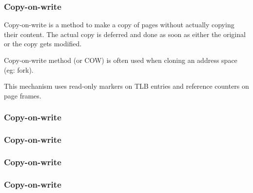 
\begin{frame}
  \frametitle{Copy-on-write}

  Copy-on-write is a method to make a copy of pages without actually copying their content. The actual copy is deferred and done as soon as either the original or the copy gets modified.

  \-

  Copy-on-write method (or COW) is often used when cloning an address
  space (eg: fork).

  \-

  This mechanism uses read-only markers on TLB entries and reference
  counters on page frames.

\end{frame}

\begin{frame}
  \frametitle{Copy-on-write}

  \begin{center}
  \end{center}

\end{frame}

\begin{frame}
  \frametitle{Copy-on-write}

  \begin{center}
  \end{center}

\end{frame}

\begin{frame}
  \frametitle{Copy-on-write}

  \begin{center}
  \end{center}

\end{frame}

\begin{frame}
  \frametitle{Copy-on-write}

  \begin{center}
  \end{center}

\end{frame}


